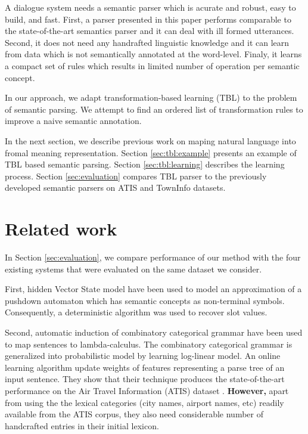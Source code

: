 \documentclass[11pt]{article}
\begin{document}
A dialogue system needs a semantic parser which is acurate and robust, easy to build, and fast. First, a parser presented in this paper performs comparable to the state-of-the-art semantics parser and it can deal with ill formed utterances. Second, it does not need any handrafted linguistic knowledge and it can learn from data which is not semantically annotated at the word-level. Finaly, it learns a compact set of rules which results in limited number of operation per semantic concept.


In our approach, we adapt transformation-based learning (TBL) \cite{brill95} to the problem of semantic parsing. We attempt to find an ordered list of transformation rules to improve a naive semantic annotation. 

In the next section, we describe previous work on maping natural language into fromal meaning representation. Section \ref{sec:tbl:example} presents an example of TBL based semantic parsing. Section \ref{sec:tbl:learning} describes the learning process. Section \ref{sec:evaluation} compares TBL parser to the previously developed semantic parsers on ATIS \cite{atis94} and TownInfo \cite{williams07,thomson08} datasets.

\section{Related work}

In Section \ref{sec:evaluation}, we compare performance of our method with the four existing systems that were evaluated on the same dataset we consider. 

First, hidden Vector State model \cite{he06} have been used to model an approximation of a pushdown automaton which has semantic concepts as non-terminal symbols. Consequently, a deterministic algorithm was used to recover slot values.

Second, automatic induction of combinatory categorical grammar \cite{zettlemoyer07} have been used to map sentences to lambda-calculus. The combinatory categorical grammar is generalized into probabilistic model by learning log-linear model. An online learning algorithm update weights of features representing a parse tree of an input sentence. They show that their technique produces the state-of-the-art performance on the Air Travel Information (ATIS) dataset \cite{atis94}. \textbf{However, }apart from using the the lexical categories (city names, airport names, etc) readily available from the ATIS corpus, they also need considerable number of handcrafted entries in their initial lexicon. 
\end{document}
